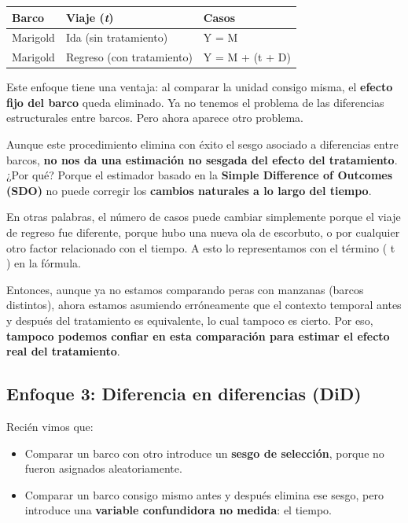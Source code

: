 \documentclass[
  letterpaper,
  DIV=11,
  numbers=noendperiod,
  oneside]{scrreprt}
\providecommand{\tightlist}{%
  \setlength{\itemsep}{0pt}\setlength{\parskip}{0pt}}\usepackage{longtable,booktabs,array}
\begin{document}
\begin{longtable}[]{@{}lll@{}}
\toprule()
Barco & Viaje (\emph{t}) & Casos \\
\midrule()
\endhead
Marigold & Ida (sin tratamiento) & Y = M \\
Marigold & Regreso (con tratamiento) & Y = M + (t + D) \\
\bottomrule()
\end{longtable}

Este enfoque tiene una ventaja: al comparar la unidad consigo misma, el
\textbf{efecto fijo del barco} queda eliminado. Ya no tenemos el
problema de las diferencias estructurales entre barcos. Pero ahora
aparece otro problema.

Aunque este procedimiento elimina con éxito el sesgo asociado a
diferencias entre barcos, \textbf{no nos da una estimación no sesgada
del efecto del tratamiento}. ¿Por qué? Porque el estimador basado en la
\textbf{Simple Difference of Outcomes (SDO)} no puede corregir los
\textbf{cambios naturales a lo largo del tiempo}.

En otras palabras, el número de casos puede cambiar simplemente porque
el viaje de regreso fue diferente, porque hubo una nueva ola de
escorbuto, o por cualquier otro factor relacionado con el tiempo. A esto
lo representamos con el término ( t ) en la fórmula.

Entonces, aunque ya no estamos comparando peras con manzanas (barcos
distintos), ahora estamos asumiendo erróneamente que el contexto
temporal antes y después del tratamiento es equivalente, lo cual tampoco
es cierto. Por eso, \textbf{tampoco podemos confiar en esta comparación
para estimar el efecto real del tratamiento}.

\hypertarget{enfoque-3-diferencia-en-diferencias-did}{%
\subsection{Enfoque 3: Diferencia en diferencias
(DiD)}\label{enfoque-3-diferencia-en-diferencias-did}}

Recién vimos que:

\begin{itemize}
\tightlist
\item
  Comparar un barco con otro introduce un \textbf{sesgo de selección},
  porque no fueron asignados aleatoriamente.
\item
  Comparar un barco consigo mismo antes y después elimina ese sesgo,
  pero introduce una \textbf{variable confundidora no medida}: el
  tiempo.
\end{itemize}
\end{document}
